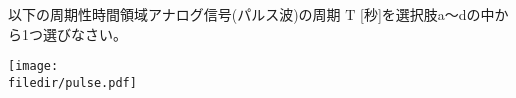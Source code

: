 以下の周期性時間領域アナログ信号(パルス波)の周期 $\textrm{T}$ [秒]を選択肢a〜dの中から1つ選びなさい。

\centering\texttt{[image: \\filedir/pulse.pdf]}
